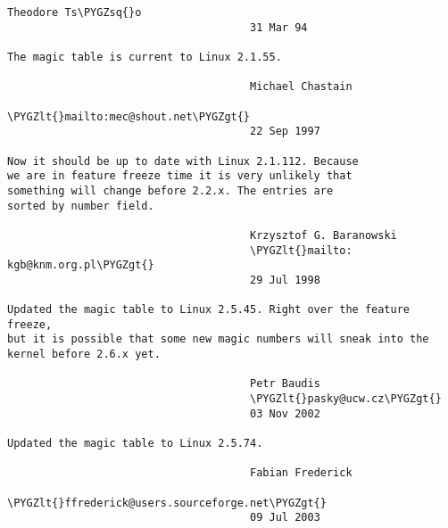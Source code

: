 \documentclass[a4paper,8pt,english]{sphinxmanual}
\def\PYGZlt{\char`\<}
\def\PYGZgt{\char`\>}
\def\PYGZsq{\char`\'}
\renewcommand\PYGZsq{\textquotesingle}
\begin{document}
\begin{Verbatim}[commandchars=\\\{\}]
                                      Theodore Ts\PYGZsq{}o
                                      31 Mar 94

The magic table is current to Linux 2.1.55.

                                      Michael Chastain
                                      \PYGZlt{}mailto:mec@shout.net\PYGZgt{}
                                      22 Sep 1997

Now it should be up to date with Linux 2.1.112. Because
we are in feature freeze time it is very unlikely that
something will change before 2.2.x. The entries are
sorted by number field.

                                      Krzysztof G. Baranowski
                                      \PYGZlt{}mailto: kgb@knm.org.pl\PYGZgt{}
                                      29 Jul 1998

Updated the magic table to Linux 2.5.45. Right over the feature freeze,
but it is possible that some new magic numbers will sneak into the
kernel before 2.6.x yet.

                                      Petr Baudis
                                      \PYGZlt{}pasky@ucw.cz\PYGZgt{}
                                      03 Nov 2002

Updated the magic table to Linux 2.5.74.

                                      Fabian Frederick
                                      \PYGZlt{}ffrederick@users.sourceforge.net\PYGZgt{}
                                      09 Jul 2003
\end{Verbatim}
\end{document}
